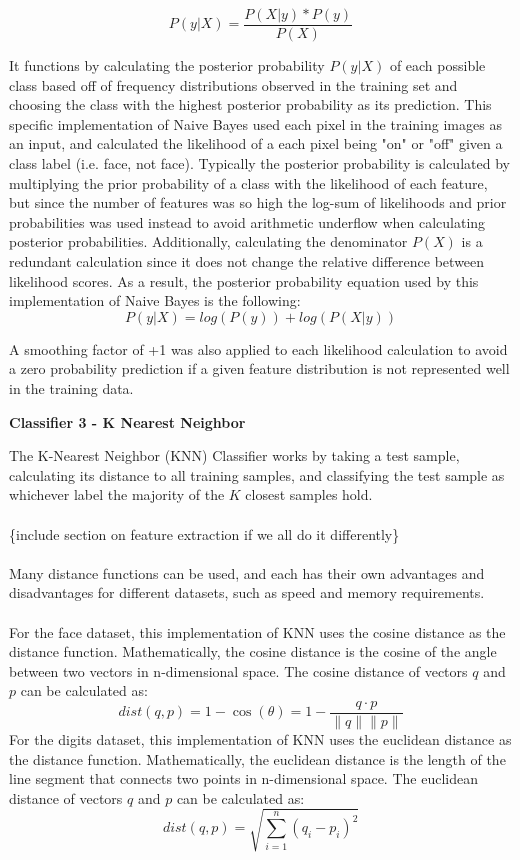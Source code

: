 \documentclass[11pt]{article}
\begin{document}
    \[P(y|X) = \frac{P(X|y)*P(y)}{P(X)}\]
    
    It functions by calculating the posterior probability $P(y|X)$ of each possible class based off of frequency distributions observed in the training set and choosing the class with the highest posterior probability as its prediction. This specific implementation of Naive Bayes used each pixel in the training images as an input, and calculated the likelihood of a each pixel being "on" or "off" given a class label (i.e. face, not face). Typically the posterior probability is calculated by multiplying the prior probability of a class  with the likelihood of each feature, but since the number of features was so high the log-sum of likelihoods and prior probabilities was used instead to avoid arithmetic underflow when calculating posterior probabilities. Additionally, calculating the denominator $P(X)$ is a redundant calculation since it does not change the relative difference between likelihood scores. As a result, the posterior probability equation used by this implementation of Naive Bayes is the following:\\ 
    \[P(y|X) = log(P(y)) + log(P(X|y))\]
    
    A smoothing factor of +1 was also applied to each likelihood calculation to avoid a zero probability prediction if a given feature distribution is not represented well in the training data.
    
    \begin{center}
        \Large
        \textbf{Classifier 3 - K Nearest Neighbor}
    \end{center}
    \normalsize
    The K-Nearest Neighbor (KNN) Classifier works by taking a test sample, calculating its
    distance to all training samples, and classifying the test sample as whichever label
    the majority of the $K$ closest samples hold.\\\\
    \{include section on feature extraction if we all do it differently\}\\\\
    Many distance functions can be used, and each has their own advantages and disadvantages for
    different datasets, such as speed and memory requirements.\\\\
    For the face dataset, this implementation of KNN uses the cosine distance as the distance function.
    Mathematically, the cosine distance is the cosine of the angle between two vectors in n-dimensional space.
    The cosine distance of vectors $q$ and $p$ can be calculated as:
    \[dist\left(q, p\right) = 1-\cos(\theta) = 1-\frac{q \cdot p}{\|q\|\|p\|}\]
    For the digits dataset, this implementation of KNN uses the euclidean distance as the distance function.
    Mathematically, the euclidean distance is the length of the line segment that connects two points in n-dimensional space.
    The euclidean distance of vectors $q$ and $p$ can be calculated as:
    \[dist\left(q, p\right) = \sqrt{\sum_{i=1}^{n}\left(q_i-p_i\right)^2}\]
\end{document}
